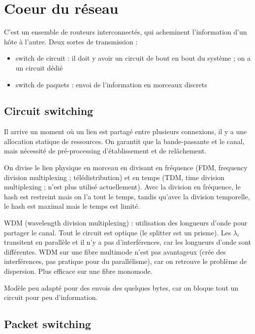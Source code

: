 \section{Coeur du réseau}

C'est un ensemble de routeurs interconnectés, qui acheminent l'information d'un hôte à l'autre. Deux sortes de transmission :

\begin{itemize}
	\item switch de circuit : il doit y avoir un circuit de bout en bout du système ; on a un circuit dédié
	\item switch de paquets : envoi de l'information en morceaux discrets
\end{itemize}

	\subsection{Circuit switching}
	
	Il arrive un moment où un lien est partagé entre plusieurs connexions, il y a une allocation statique de ressources. On garantit que la bande-passante et le canal, mais nécessité de pré-processing d'établissement et de relâchement.
	
	On divise le lien physique en morceau en divisant en fréquence (FDM, frequency division multiplexing ; télédistribution) et en temps (TDM, time division multiplexing ; n'est plus utilisé actuellement). Avec la division en fréquence, le hash est restreint mais on l'a tout le temps, tandis qu'avec la division temporelle, le hash est maximal mais le temps est limité.
	
	
	WDM (wavelength division multiplexing) : utilisation des longueurs d'onde pour partager le canal. Tout le circuit est optique (le splitter est un prisme). Les $\lambda_i$ transitent en parallèle et il n'y a pas d'interférences, car les longueurs d'onde sont différentes. WDM sur une fibre multimode n'est pas avantageux (crée des interférences, pas pratique pour du parallélisme), car on retrouve le problème de dispersion. Plus efficace sur une fibre monomode.
	
	
	Modèle peu adapté pour des envois des quelques bytes, car on bloque tout un circuit pour peu d'information.
	
	\subsection{Packet switching}
	
